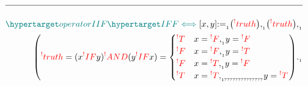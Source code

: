 \documentclass[a4paper]{article}
\def\ml{\mleft}
\def\mr{\mright}
\newcommand{\defeq}{:=}
\newcommand{\cusnum}[2]{{#1}_{{\phantom{ }}_{#2}}}
\newcommand{\cusand}{,}
\newcommand{\cuspop}{.}
\newcommand{\n}{\\[1.5ex] \hline \nonumber \\[0ex]}
\newcommand{\m}{\nonumber \\}
\begin{document}
\begin{tcolorbox}
\begin{align}
\n \dfn{operatorIIF} [\dfn{IFF}[\iff]][x, y] \cusnum{\defeq}{1} \ml(\rfr{truth} [x][]\mr) \cusnum{\cusand}{1} \ml(\rfr{truth} [y][]\mr) \cusnum{\cusand}{1}
\m \ml(\rfr{truth} [x \rfr{IFF} y][] = (x \rfr{IF} y) \rfr{AND} (y \rfr{IF} x) = \begin{cases} \rfr{T} & x = \rfr{F} \cusnum{\cusand}{1} y = \rfr{F} \\ \rfr{F} & x = \rfr{F} \cusnum{\cusand}{1} y = \rfr{T} \\ \rfr{F} & x = \rfr{T} \cusnum{\cusand}{1} y = \rfr{F} \\ \rfr{T} & x = \rfr{T} \cusnum{\cusand}{1??????????????} y = \rfr{T} \end{cases}\mr) \cusnum{\cuspop}{1}
\end{align}
\end{tcolorbox}
\end{document}

